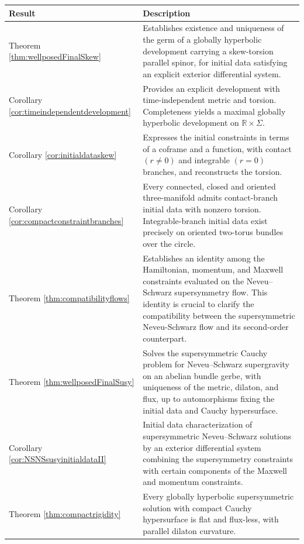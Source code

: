 \documentclass[10pt,reqno,a4paper]{amsart}
\theoremstyle{plain}
\theoremstyle{definition}
\theoremstyle{remark}
\theoremstyle{remark}
\renewcommand{\(}{ (}
\renewcommand{\)}{ )}
\begin{document}
\begin{table}[htbp]
\centering
\small
\renewcommand{\arraystretch}{1.2}
\begin{tabular}{|>{\raggedright\arraybackslash}p{}|>{\raggedright\arraybackslash}p{}|}
\hline
\textbf{Result} & \textbf{Description} \\
\hline
Theorem \ref{thm:wellposedFinalSkew}
&
Establishes existence and uniqueness of the germ of a globally hyperbolic development carrying a skew-torsion parallel spinor, for initial data satisfying an explicit exterior differential system.
\\
\hline
Corollary \ref{cor:timeindependentdevelopment}
&
Provides an explicit development with time-independent metric and torsion. Completeness yields a maximal globally hyperbolic development on $\mathbb{R}\times\Sigma$.
\\
\hline
Corollary \ref{cor:initialdataskew}
&
Expresses the initial constraints in terms of a coframe and a function, with contact $(r\neq 0)$ and integrable $(r=0)$ branches, and reconstructs the torsion.
\\
\hline
Corollary \ref{cor:compactconstraintbranches}
&
Every connected, closed and oriented three-manifold admits contact-branch initial data with nonzero torsion. Integrable-branch initial data exist precisely on oriented two-torus bundles over the circle.
\\
\hline
Theorem \ref{thm:compatibilityflows}
&
Establishes an identity among the Hamiltonian, momentum, and Maxwell constraints evaluated on the Neveu--Schwarz supersymmetry flow. This identity is crucial to clarify the compatibility between the supersymmetric Neveu-Schwarz flow and its second-order counterpart.
\\
\hline
Theorem \ref{thm:wellposedFinalSusy}
&
Solves the supersymmetric Cauchy problem for Neveu--Schwarz supergravity on an abelian bundle gerbe, with uniqueness of the metric, dilaton, and flux, up to automorphisms fixing the initial data and Cauchy hypersurface.
\\
\hline
Corollary \ref{cor:NSNSsusyinitialdataII}
&
Initial data characterization of supersymmetric Neveu--Schwarz solutions by an exterior differential system combining the supersymmetry constraints with certain components of the Maxwell and momentum constraints.
\\
\hline
Theorem \ref{thm:compactrigidity}
&
Every globally hyperbolic supersymmetric solution with compact Cauchy hypersurface is flat and flux-less, with parallel dilaton curvature.
\\
\hline
\end{tabular} 
\end{table}
 
\end{document}
